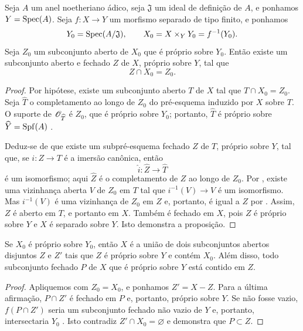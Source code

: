 \begin{proposition}[5.5.1]
\label{III.5.5.1}
Seja $A$ um anel noetheriano ádico, seja $\mathfrak{J}$ um ideal
de definição de $A$, e ponhamos $Y=\operatorname{Spec}(A)$. Seja $f:X\to Y$ um
morfismo separado de tipo finito, e ponhamos
\[
  Y_0=\operatorname{Spec}(A/\mathfrak{J}),\qquad
  X_0=X\times_Y Y_0=f^{-1}(Y_0).
\]
Seja $Z_0$ um subconjunto aberto de $X_0$ que é próprio sobre $Y_0$.
Então existe um subconjunto aberto e fechado $Z$ de $X$, próprio sobre
$Y$, tal que
\[
  Z\cap X_0=Z_0.
\]
\end{proposition}

\begin{proof}
Por hipótese, existe um subconjunto aberto $T$ de $X$ tal que
$T\cap X_0=Z_0$. Seja $\widehat{T}$ o completamento ao longo de $Z_0$
do pré-esquema induzido por $X$ sobre $T$. O suporte de
$\mathscr{O}_{\widehat{T}}$ é $Z_0$, que é próprio sobre $Y_0$;
portanto, $\widehat{T}$ é próprio sobre
$\widehat{Y}=\operatorname{Spf}(A)$ .

Deduz-se de  que existe um subpré-esquema fechado
$Z$ de $T$, próprio sobre $Y$, tal que, se
$i:Z\to T$ é a imersão canônica, então
\[
  \widehat{i}:\widehat{Z}\longrightarrow\widehat{T}
\]
é um isomorfismo; aqui $\widehat{Z}$ é o completamento de $Z$
ao longo de $Z_0$. Por , existe uma vizinhança aberta
$V$ de $Z_0$ em $T$ tal que
$i^{-1}(V)\to V$ é um isomorfismo. Mas $i^{-1}(V)$ é uma
vizinhança de $Z_0$ em $Z$ e, portanto, é igual a $Z$ por
. Assim, $Z$ é aberto em $T$, e portanto em $X$.
Também é fechado em $X$, pois $Z$ é próprio sobre $Y$ e $X$ é
separado sobre $Y$. Isto demonstra a proposição.
\end{proof}

\begin{corollary}[5.5.2]
\label{III.5.5.2}
Se $X_0$ é próprio sobre $Y_0$, então $X$ é a união de dois
subconjuntos abertos disjuntos $Z$ e $Z'$ tais que $Z$ é próprio sobre
$Y$ e contém $X_0$. Além disso, todo subconjunto fechado $P$ de $X$
que é próprio sobre $Y$ está contido em $Z$.
\end{corollary}

\begin{proof}
Apliquemos  com $Z_0=X_0$, e ponhamos $Z'=X-Z$. Para a
última afirmação, $P\cap Z'$ é fechado em $P$ e, portanto, próprio
sobre $Y$. Se não fosse vazio, $f(P\cap Z')$ seria um subconjunto fechado
não vazio de $Y$ e, portanto, intersectaria $Y_0$
. Isto contradiz
$Z'\cap X_0=\varnothing$ e demonstra que $P\subset Z$.
\end{proof}

